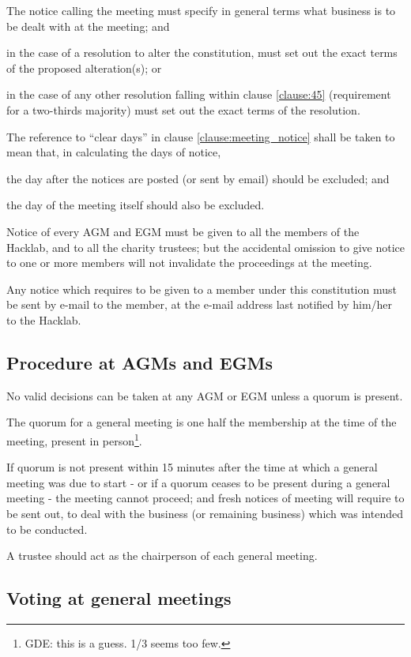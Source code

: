 \documentclass{article}
\begin{document}
\clause The notice calling the meeting must specify in general terms
what business is to be dealt with at the meeting; and 

\subclause in the case of a resolution to alter the constitution, must
set out the exact terms of the proposed alteration(s); or

\subclause in the case of any other resolution falling within clause
\ref{clause:45} (requirement for a two-thirds majority) must set out
the exact terms of the resolution.

\clause The reference to ``clear days'' in clause
\ref{clause:meeting_notice} shall be taken to mean that, in
calculating the days of notice, 

\subclause the day after the notices are posted (or sent by email)
should be excluded; and

\subclause the day of the meeting itself should also be excluded.

\clause Notice of every AGM and EGM must be given to all the members
of the Hacklab, and to all the charity trustees; but the accidental
omission to give notice to one or more members will not invalidate the
proceedings at the meeting.

\clause Any notice which requires to be given to a member under this
constitution must be sent by e-mail to the member, at the e-mail
address last notified by him/her to the Hacklab.

\subsection{Procedure at AGMs and EGMs}

\clause No valid decisions can be taken at any AGM or EGM unless a
quorum is present.

\clause The quorum for a general meeting is one half the membership at
the time of the meeting, present in person\footnote{GDE: this is a
  guess. 1/3 seems too few.}.

\clause If quorum is not present within 15 minutes after the time at
which a general meeting was due to start - or if a quorum ceases to be
present during a general meeting - the meeting cannot proceed; and
fresh notices of meeting will require to be sent out, to deal with the
business (or remaining business) which was intended to be conducted.

\clause A trustee should act as the chairperson of each general
meeting.

\subsection{Voting at general meetings}
\end{document}
